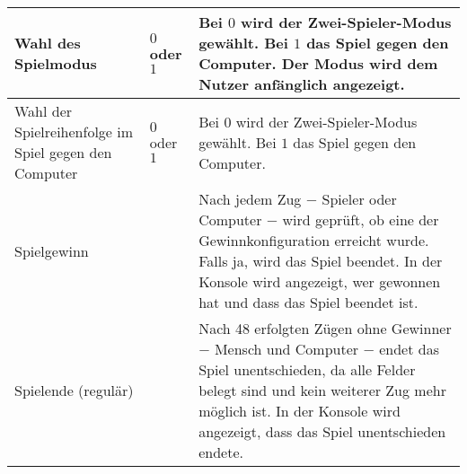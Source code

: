 \documentclass[a4paper]{article}
\begin{document}
\begin{exercise}{2}
\begin{itemize}
\begin{center}
\begin{tabular}{| p{2.5cm} | p{2.2cm} | p{10cm} |}
		Wahl des \newline Spielmodus & $0$ oder $1$
		& Bei $0$ wird der Zwei\--Spieler\--Modus gew\"ahlt. Bei $1$ das Spiel gegen den Computer. Der Modus wird dem Nutzer anf\"anglich angezeigt. \\ \hline
		
		Wahl der Spielreihenfolge im Spiel gegen den Com\-puter & $0$ oder $1$
		& Bei $0$ wird der Zwei-Spieler-Modus gew\"ahlt. Bei $1$ das Spiel gegen den Computer.\\ \hline

		Spielgewinn &
		& Nach jedem Zug $-$ Spieler oder Computer $-$ wird gepr\"uft, ob eine der Gewinnkonfiguration erreicht wurde. Falls ja, wird das
		Spiel beendet. In der Konsole wird angezeigt, wer gewonnen hat und dass das Spiel beendet
		ist. \\ \hline
				
		Spielende \newline (regul\"ar) &
		& Nach 48 erfolgten Z\"ugen ohne Gewinner $-$ Mensch und Computer $-$ endet das Spiel unentschieden, da alle Felder belegt sind und kein weiterer Zug mehr m\"oglich ist. In der Konsole wird angezeigt, dass das Spiel unentschieden endete. \\ \hline
	\end{tabular}
\end{center}


\end{itemize}

\end{exercise}


\end{document}
